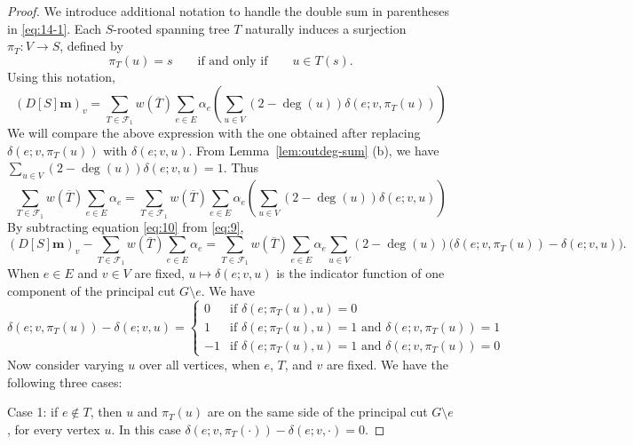 \documentclass{amsart}
\theoremstyle{definition}
\newcommand{\boldm}{\mathbf{m}}
\newcommand{\trees}{\mathcal{F}_1}
\newcommand{\degout}{\deg^o}
\begin{document}
\begin{proof}
We introduce additional notation to handle the double sum in parentheses in \eqref{eq:14-1}.
Each $S$-rooted spanning tree $T$ naturally induces a surjection $\pi_T: V \to S$, defined by 
\[
	\pi_T(u) = s \qquad\text{if and only if}\qquad u \in T(s).
\]
Using this notation,
\begin{equation}
\label{eq:9}
	(D[S] \boldm)_v = \sum_{T \in \trees} w(\overline{T}) \sum_{e \in E} \alpha_e \left( \sum_{u \in V} (2 - \deg(u)) \delta(e; v,\pi_T(u)) \right)
\end{equation}
We will compare the above expression with the one obtained after replacing $\delta(e; v,\pi_T(u))$ with $\delta(e; v, u)$.
From Lemma~\ref{lem:outdeg-sum} (b), 
we have
$\displaystyle
	\sum_{u \in V} (2 - \deg(u)) \delta(e; v,u)
	= 1. 
$
Thus
\begin{equation}
\label{eq:10}
	\sum_{T \in \trees} w(\overline{T}) \sum_{e \in E} \alpha_e
	= \sum_{T \in \trees} w(\overline{T}) \sum_{e \in E} \alpha_e \left( \sum_{u \in V} (2 - \deg(u)) \delta(e; v,u) \right) 
\end{equation}
By subtracting equation \eqref{eq:10} from \eqref{eq:9},
\[
	(D[S] \boldm)_v - \sum_{T \in \trees} w(\overline{T}) \sum_{e \in E} \alpha_e 
	= \sum_{T \in \trees} w(\overline{T}) \sum_{e \in E} \alpha_e \sum_{u \in V} (2 - \deg(u)) \Big(\delta(e; v, \pi_T(u)) - \delta(e; v, u) \Big).
\]
When $e \in E$ and $v \in V$ are fixed, $u \mapsto \delta(e; v, u)$ is the indicator function of one component of the principal cut $G \setminus e$.
We have
\begin{equation}
\label{eq:delta-diff}
	\delta(e; v, \pi_T(u)) - \delta(e; v, u) = \begin{cases}
	0 &\text{if } \delta(e; \pi_T(u), u) = 0 \\
	1 &\text{if } \delta(e; \pi_T(u), u) = 1 \text{ and } \delta(e; v, \pi_T(u)) = 1 \\
	-1 &\text{if } \delta(e; \pi_T(u), u) = 1 \text{ and } \delta(e; v, \pi_T(u)) = 0
	\end{cases}
\end{equation}
Now consider varying $u$ over all vertices, when $e$, $T$, and $v$ are fixed.
We have the following three cases:

Case 1: if $e \not \in T$, then $u$ and $\pi_T(u)$ are on the same side of the principal cut $G \setminus e$, for every vertex $u$.
In this case $\delta(e;v, \pi_T(\cdot)) - \delta(e; v, \cdot) = 0$.


\end{proof}
\end{document}
